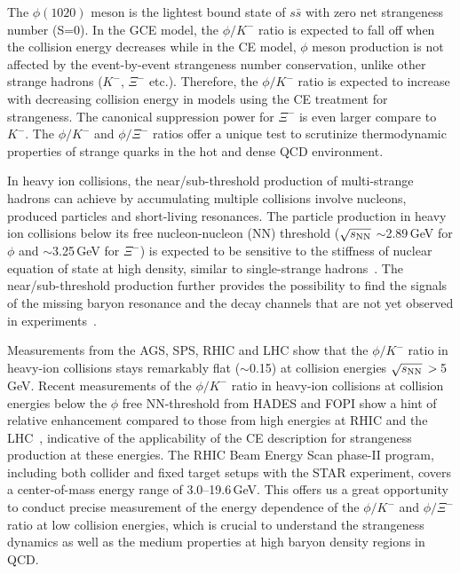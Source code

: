\documentclass[%
 reprint,	
showpacs,
 amsmath,amssymb,
 aps,
 prc,
]{revtex4-1}
\begin{document}
The $\phi(1020)$ meson is the lightest bound state of $s\bar{s}$ with zero net strangeness number (S=0). %
In the GCE model, the $\phi/K^-$ ratio is expected to fall off when the collision energy decreases while in the CE model, $\phi$ meson production is not affected by the event-by-event strangeness number conservation, unlike other strange hadrons ($K^-$, $\Xi^-$ etc.). Therefore, the $\phi/K^-$ ratio is expected to increase with decreasing collision energy in models using the CE treatment for strangeness. The canonical suppression power for $\Xi^-$ is even larger compare to $K^-$. The $\phi/K^-$ and $\phi/\Xi^-$ ratios offer a unique test to scrutinize thermodynamic properties of strange quarks in the hot and dense QCD environment.

In heavy ion collisions, the near/sub-threshold production of multi-strange hadrons can achieve by accumulating multiple collisions involve nucleons, produced particles and short-living resonances. The particle production in heavy ion collisions below its free nucleon-nucleon (NN) threshold ($\sqrt{s_{\rm NN}}$ $\sim$2.89\,GeV for $\phi$ and $\sim$3.25\,GeV for $\Xi^-$) is expected to be sensitive to the stiffness of nuclear equation of state at high density, similar to single-strange hadrons~\cite{KO.PhysRevLett.55.2661,FUCHS20061_kaons}. The near/sub-threshold production further provides the possibility to find the signals of the missing baryon resonance and the decay channels that are not yet observed in experiments~\cite{Steinheimer_2015_UrQMD,KO_sQM17}. 

Measurements from the AGS, SPS, RHIC and LHC show that the $\phi/K^-$ ratio in heavy-ion collisions stays remarkably flat ($\sim$0.15) at collision energies $\sqrt{s_{\rm NN}}\,>\,$5\,GeV. Recent measurements of the $\phi/K^-$ ratio in heavy-ion collisions at collision energies below the $\phi$ free NN-threshold from HADES and FOPI show a hint of relative enhancement compared to those from high energies at RHIC and the LHC~\cite{E917_phi,NA49_phi,FOPI_phi_AlAl,FOPI_phi_NiNi,HADES_phi_ArKCl,HADES_phi_AuAu}, indicative of the applicability of the CE description for strangeness production at these energies. %
The RHIC Beam Energy Scan phase-II program, including both collider and fixed target setups with the STAR experiment, covers a center-of-mass energy range of 3.0--19.6\,GeV. This offers us a great opportunity to conduct precise measurement of the energy dependence of the $\phi/K^-$ and $\phi/\Xi^-$ ratio at low collision energies, which is crucial to understand the strangeness dynamics as well as the medium properties at high baryon density regions in QCD.
\end{document}
